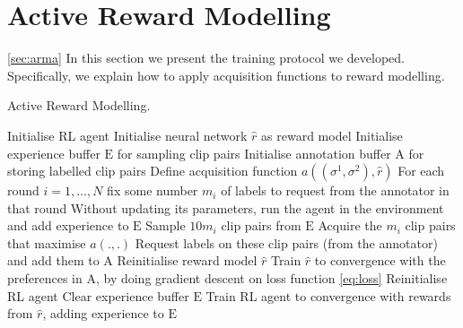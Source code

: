 \documentclass[11pt, a4paper, bibliography=totoc]{report}
\newcommand{\rp}{\hat{r}}
\newcommand{\expbuff}{\mathrm{E}}
\newcommand{\annbuff}{\mathrm{A}}
\begin{document}
\section{Active Reward Modelling} \ref{sec:arma}
In this section we present the training protocol we developed. Specifically, we explain how to apply acquisition functions to reward modelling. %
\begin{algorithm}
	\caption{Active Reward Modelling.}
	\label{alg:arma}
	\begin{algorithmic}[1]
        \State Initialise RL agent
		\State Initialise neural network $ \rp $ as reward model
		\State Initialise experience buffer $ \expbuff $ for sampling clip pairs
		\State Initialise annotation buffer $ \annbuff $ for storing labelled clip pairs
		\State Define acquisition function $ a((\sigma^1, \sigma^2), \rp) $
		\State For each round $ i=1, \dots, N $ fix some number $ m_i $ of labels to request from the annotator in that round
		\State Without updating its parameters, run the agent in the environment and add experience to $ \expbuff $
		\State Sample $ 10m_i $ clip pairs from $ \expbuff $ \label{line:sample_exp}
		\State Acquire the $ m_i $ clip pairs that maximise $ a(.,.) $ \label{line:acquire}
		\State Request labels on these clip pairs (from the annotator) and add them to $ \annbuff $
		\State Reinitialise reward model $ \rp $ \label{line:train_r}
		\State Train $ \rp $ to convergence with the preferences in $ \annbuff $, by doing gradient descent on loss function \ref{eq:loss}
		\State Reinitialise RL agent
		\State Clear experience buffer $ \expbuff $
		\State Train RL agent to convergence with rewards from $ \rp $, adding experience to $ \expbuff $ \label{line:call_dqn}
		\EndFor
	\end{algorithmic}
\end{algorithm}
\end{document}
